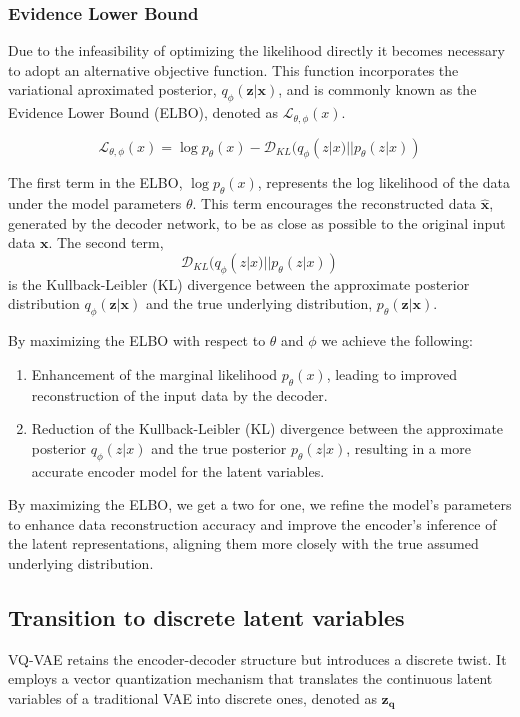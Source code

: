 \subsubsection{Evidence Lower Bound}
Due to the infeasibility of optimizing the likelihood directly it becomes necessary to adopt an alternative objective function. This function incorporates the variational aproximated posterior, $q_\phi(\mathbf{z}|\mathbf{x})$, and is commonly known as the Evidence Lower Bound (ELBO), denoted as $\mathcal{L}_{\theta, \phi}(x)$.

\begin{equation}
    \mathcal{L}_{\theta, \phi}(x) = \log p_\theta(x) - \mathcal{D}_{KL}(q_\phi(z|x) || p_\theta(z|x))
    \label{eq:ELBO}
\end{equation}

The first term in the ELBO, $\log p_\theta(x)$, represents the log likelihood of the data under the model parameters $\theta$. This term encourages the reconstructed data $\hat{\mathbf{x}}$, generated by the decoder network, to be as close as possible to the original input data $\mathbf{x}$.
The second term, 
\begin{equation}
\mathcal{D}_{KL}(q_\phi(z|x) || p_\theta(z|x))
\end{equation}
is the Kullback-Leibler (KL) divergence between the approximate posterior distribution $q_\phi(\mathbf{z}|\mathbf{x})$ and the true underlying distribution, $p_\theta(\mathbf{z}|\mathbf{x})$.

By maximizing the ELBO with respect to \( \theta \) and \( \phi \) we achieve the following:

\begin{enumerate}
    \item Enhancement of the marginal likelihood \( p_\theta(x) \), leading to improved reconstruction of the input data by the decoder.
    \item Reduction of the Kullback-Leibler (KL) divergence between the approximate posterior \( q_\phi(z|x) \) and the true posterior \( p_\theta(z|x) \), resulting in a more accurate encoder model for the latent variables.
\end{enumerate}

By maximizing the ELBO, we get a two for one, we refine the model's parameters to enhance data reconstruction accuracy and improve the encoder's inference of the latent representations, aligning them more closely with the true assumed underlying distribution.\cite{VAE}
\subsection{Transition to discrete latent variables}
VQ-VAE retains the encoder-decoder structure but introduces a discrete twist. It employs a vector quantization mechanism that translates the continuous latent variables of a traditional VAE into discrete ones, denoted as $\mathbf{z_q}$

